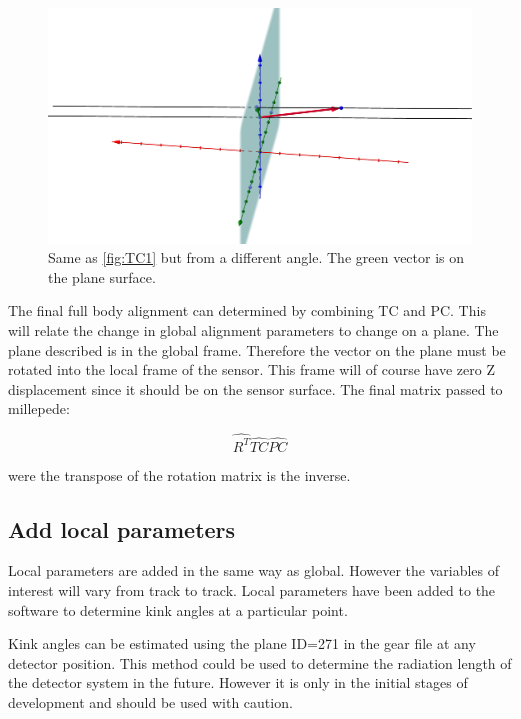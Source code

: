 \begin{figure}[H]
\centering
\includegraphics[width=1.0\linewidth]{figures/alignmentBigger.png}
\caption{Same as \ref{fig:TC1} but from a different angle. The green vector is on the plane surface.}
\label{fig:TC2}
\end{figure}

The final full body alignment can determined by combining TC and PC. This will relate the change in global alignment parameters to change on a plane. The plane described is in the global frame. Therefore the vector on the plane must be rotated into the local frame of the sensor. This frame will of course have zero Z displacement since it should be on the sensor surface. The final matrix passed to millepede:

\begin{equation}
\hat{R^{T}} \hat{TC} \hat{PC} 
\end{equation}

were the transpose of the rotation matrix is the inverse.

\subsection{Add local parameters}

Local parameters are added in the same way as global. However the variables of interest will vary from track to track. Local parameters have been added to the software to determine kink angles at a particular point.

Kink angles can be estimated using the plane ID=271 in the gear file at any detector position. This method could be used to determine the radiation length of the detector system in the future. However it is only in the initial stages of development and should be used with caution.

